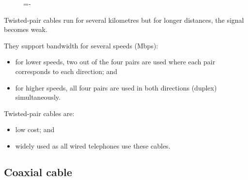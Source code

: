 \documentclass[a4paper]{systems-software}
\begin{document}
\begin{figure}[H]
	\lineskip=-\fboxrule
\end{figure}

Twisted-pair cables run for several kilometres but for longer distances, the signal becomes weak.

They support bandwidth for several speeds (Mbps):
\begin{itemize}
	\item for lower speeds, two out of the four pairs are used where each pair corresponds to each direction; and
	\item for higher speeds, all four pairs are used in both directions (duplex) simultaneously.
\end{itemize}

Twisted-pair cables are:
\begin{itemize}
	\item low cost; and
	\item widely used as all wired telephones use these cables.
\end{itemize}


\subsection*{Coaxial cable}
\end{document}

